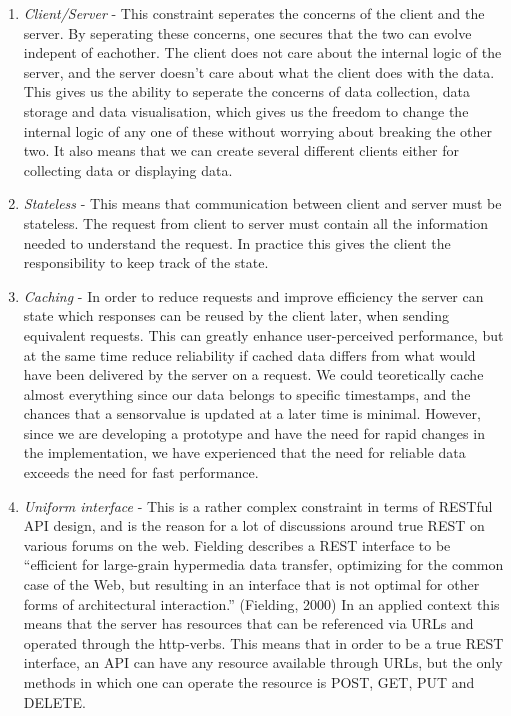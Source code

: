 \begin{enumerate}
\item{} \emph{Client/Server} - This constraint seperates the concerns of the client and the server. By seperating these concerns, one secures that the two can evolve indepent of eachother. The client does not care about the internal logic of the server, and the server doesn’t care about what the client does with the data. This gives us the ability to seperate the concerns of data collection, data storage and data visualisation, which gives us the freedom to change the internal logic of any one of these without worrying about breaking the other two. It also means that we can create several different clients either for collecting data or displaying data.

\item{} \emph{Stateless} - This means that communication between client and server must be stateless. The request from client to server must contain all the information needed to understand the request. In practice this gives the client the responsibility to keep track of the state.

\item{} \emph{Caching} - In order to reduce requests and improve efficiency the server can state which responses can be reused by the client later, when sending equivalent requests. This can greatly enhance user-perceived performance, but at the same time reduce reliability if cached data differs from what would have been delivered by the server on a request. We could teoretically cache almost everything since our data belongs to specific timestamps, and the chances that a sensorvalue is updated at a later time is minimal. However, since we are developing a prototype and have the need for rapid changes in the implementation, we have experienced that the need for reliable data exceeds the need for fast performance.

\item{} \emph{Uniform interface} - This is a rather complex constraint in terms of RESTful API design, and is the reason for a lot of discussions around true REST on various forums on the web. Fielding describes a REST interface to be “efficient for large-grain hypermedia data transfer, optimizing for the common case of the Web, but resulting in an interface that is not optimal for other forms of architectural interaction.” (Fielding, 2000) In an applied context this means that the server has resources that can be referenced via URLs and operated through the http-verbs. This means that in order to be a true REST interface, an API can have any resource available through URLs, but the only methods in which one can operate the resource is POST, GET, PUT and DELETE.


\end{enumerate}
